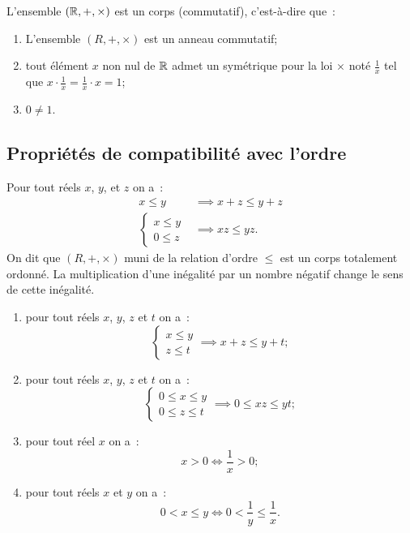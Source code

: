 \begin{prop}
  L'ensemble \((\mathbb{R}, +, \times)\) est un corps (commutatif), c'est-à-dire que~:
  \begin{enumerate}
    \item L'ensemble \((R, +, \times)\) est un anneau commutatif;
    \item tout élément \(x\) non nul de \(\mathbb{R}\) admet un symétrique pour la loi
      \(\times\) noté \(\frac{1}{x}\) tel que \(x\cdot \frac{1}{x} =
      \frac{1}{x}\cdot x = 1\);
    \item \(0\neq 1\).
  \end{enumerate}
\end{prop}

\subsection{Propriétés de compatibilité avec l'ordre}

\begin{prop}
  Pour tout réels \(x\), \(y\), et \(z\) on a~:
  \begin{align}
    x\leqslant y &\implies x + z\leqslant y + z \\
    \begin{cases} x\leqslant y \\ 0\leqslant z \end{cases} &\implies xz
    \leqslant yz.
  \end{align}
  On dit que \((R, +, \times)\) muni de la relation d'ordre \(\leqslant\) est un
  corps totalement ordonné. La multiplication d'une inégalité par un nombre
  négatif change le sens de cette inégalité.
\end{prop}
\begin{enumerate}
  \item pour tout réels \(x\), \(y\), \(z\) et \(t\) on a~:
    \begin{equation}
      \begin{cases}
      x\leqslant y \\ z \leqslant t \end{cases} \implies x + z\leqslant y + t;
    \end{equation}
  \item pour tout réels \(x\), \(y\), \(z\) et \(t\) on a~:
    \begin{equation}
      \begin{cases}
      0 \leqslant x\leqslant y \\ 0 \leqslant z \leqslant t \end{cases} \implies
      0\leqslant xz \leqslant yt;
    \end{equation}
  \item pour tout réel \(x\) on a~:
    \begin{equation}
      x > 0 \iff \frac{1}{x} > 0;
    \end{equation}
  \item pour tout réels \(x\) et \(y\) on a~:
    \begin{equation}
      0 < x \leqslant y \iff 0 < \frac{1}{y} \leqslant \frac{1}{x}.
    \end{equation}
\end{enumerate}

